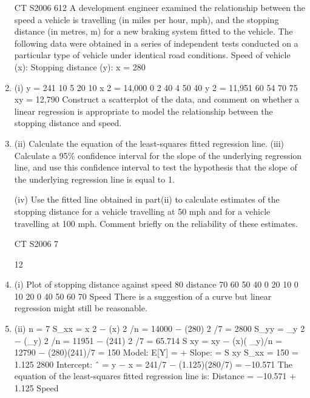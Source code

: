 \documentclass[a4paper,12pt]{article}
\begin{document}
\begin{enumerate}

CT S2006
612
A development engineer examined the relationship between the speed a vehicle is travelling (in miles per hour, mph), and the stopping distance (in metres, m) for a new
braking system fitted to the vehicle. The following data were obtained in a series of
independent tests conducted on a particular type of vehicle under identical road conditions.
Speed of vehicle (x):
Stopping distance (y):
x = 280
\item (i)
y = 241
10
5
20
10
x 2 = 14,000
0
2
40
4
50
40
y 2 = 11,951
60
54
70
75
xy = 12,790
Construct a scatterplot of the data, and comment on whether a linear
regression is appropriate to model the relationship between the stopping
distance and speed. 
\item (ii) Calculate the equation of the least-squares fitted regression line. 
(iii) Calculate a 95\% confidence interval for the slope of the underlying regression
line, and use this confidence interval to test the hypothesis that the slope of the
underlying regression line is equal to 1.

(iv) Use the fitted line obtained in part(ii) to calculate estimates of the stopping
distance for a vehicle travelling at 50 mph and for a vehicle travelling at 100
mph.
Comment briefly on the reliability of these estimates.

CT S2006
7



12
\item (i)
Plot of stopping distance against speed
80
distance
70
60
50
40
0
20
10
0
10
20
0
40
50
60
70
Speed
There is a suggestion of a curve but linear regression might still be reasonable.
\item (ii)
n = 7
S_{xx} = \sigma x 2 − (\sigma x) 2 /n = 14000 − (280) 2 /7 = 2800
S_{yy} = \sigma_y 2 − (\sigma_y) 2 /n = 11951 − (241) 2 /7 = 65.714
S xy = \sigma xy − (\sigma x)( \sigma_y)/n = 12790 − (280)(241)/7 = 150
Model: E[Y] = \alpha + \betax
Slope: \hat{\beta} =
S xy
S_{xx}
=
150
= 1.125
2800
Intercept: \alpha ˆ = y − \hat{\beta} x = 241/7 − (1.125)(280/7) = −10.571
The equation of the least-squares fitted regression line is:
Distance = −10.571 + 1.125 Speed



\end{enumerate}
\end{document}
